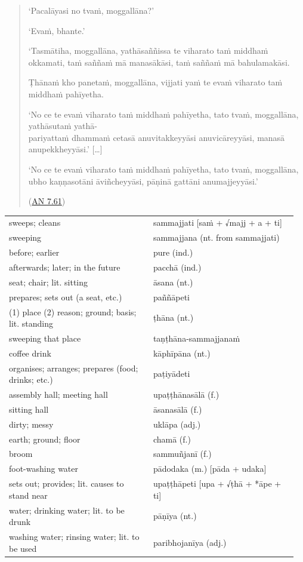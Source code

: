 \documentclass[11pt,oneside]{memoir}
\begin{document}
\begin{quote}
`Pacalāyasi no tvaṁ, moggallāna?'

`Evaṁ, bhante.'

`Tasmātiha, moggallāna, yathāsaññissa te viharato taṁ middhaṁ okkamati, taṁ
saññaṁ mā manasākāsi, taṁ saññaṁ mā bahulamakāsi.

Ṭhānaṁ kho panetaṁ, moggallāna, vijjati yaṁ te evaṁ viharato taṁ middhaṁ pahīyetha.

`No ce te evaṁ viharato taṁ middhaṁ pahīyetha, tato tvaṁ, moggallāna, yathāsutaṁ yathā-\\[0pt]
pariyattaṁ dhammaṁ cetasā anuvitakkeyyāsi anuvicāreyyāsi, manasā anupekkheyyāsi.' [\ldots{}]

`No ce te evaṁ viharato taṁ middhaṁ pahīyetha, tato tvaṁ, moggallāna, ubho
kaṇṇasotāni āviñcheyyāsi, pāṇinā gattāni anumajjeyyāsi.'

(\href{https://suttacentral.net/an7.61/en/sujato}{AN 7.61})
\end{quote}

\clearpage

\begin{longtable}{L{0.48\linewidth} L{0.48\linewidth}}
sweeps; cleans & sammajjati [saṁ + √majj + a + ti]\\[0pt]
sweeping & sammajjana (nt. from sammajjati)\\[0pt]
before; earlier & pure (ind.)\\[0pt]
afterwards; later; in the future & pacchā (ind.)\\[0pt]
seat; chair; lit. sitting & āsana (nt.)\\[0pt]
prepares; sets out (a seat, etc.) & paññāpeti\\[0pt]
(1) place (2) reason; ground; basis;  lit. standing & ṭhāna (nt.)\\[0pt]
sweeping that place & taṇṭhāna-sammajjanaṁ\\[0pt]
coffee drink & kāphīpāna (nt.)\\[0pt]
organises; arranges; prepares (food; drinks; etc.) & paṭiyādeti\\[0pt]
assembly hall; meeting hall & upaṭṭhānasālā (f.)\\[0pt]
sitting hall & āsanasālā (f.)\\[0pt]
dirty; messy & uklāpa (adj.)\\[0pt]
earth; ground; floor & chamā (f.)\\[0pt]
broom & sammuñjanī (f.)\\[0pt]
foot-washing water & pādodaka (m.) [pāda + udaka]\\[0pt]
sets out; provides; lit. causes to stand near & upaṭṭhāpeti [upa + √ṭhā + *āpe + ti]\\[0pt]
water; drinking water; lit. to be drunk & pāṇīya (nt.)\\[0pt]
washing water; rinsing water; lit. to be used & paribhojanīya (adj.)\\[0pt]
\end{longtable}
\end{document}
